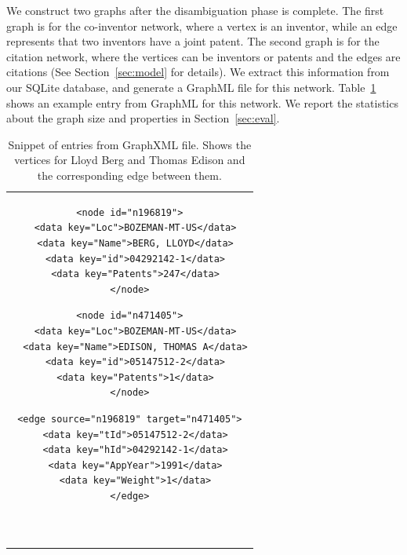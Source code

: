 We construct two graphs after the disambiguation phase is complete. 
The first graph is for the co-inventor network, where a vertex is an inventor, while an edge represents that two inventors have a joint patent. The second graph is for the citation network, where the vertices can be inventors or patents and the edges are citations (See Section~\ref{sec:model} for details).
We extract this information from our SQLite database, and generate a GraphML file for this network.
Table~\ref{listing} shows an example entry from GraphML for this network.
We report the statistics about the graph size and properties in Section~\ref{sec:eval}.

\begin{table}[h] 
  \centering
  \begin{tabular}{@{}c@{}} 

  \begin{minipage}{0.25\linewidth}

\begin{lstlisting}[]
<node id="n196819">
  <data key="Loc">BOZEMAN-MT-US</data>
  <data key="Name">BERG, LLOYD</data>
  <data key="id">04292142-1</data>
  <data key="Patents">247</data>
</node>
\end{lstlisting}

  \end{minipage}
  \hspace{0.05\linewidth}
  \begin{minipage}{0.3\linewidth}

\begin{lstlisting}[]
<node id="n471405">
  <data key="Loc">BOZEMAN-MT-US</data>
  <data key="Name">EDISON, THOMAS A</data>
  <data key="id">05147512-2</data>
  <data key="Patents">1</data>
</node>
\end{lstlisting}

  \end{minipage}
  \hspace{0.05\linewidth}
  \begin{minipage}{0.3\linewidth}

\begin{lstlisting}[]
<edge source="n196819" target="n471405">
  <data key="tId">05147512-2</data>
  <data key="hId">04292142-1</data>
  <data key="AppYear">1991</data>
  <data key="Weight">1</data>
</edge>



\end{lstlisting}

  \end{minipage}
  
  \end{tabular}

\label{listing}
\caption{\footnotesize Snippet of entries from GraphXML file. Shows the vertices for Lloyd Berg and Thomas Edison and the corresponding edge between them.}
\end{table}